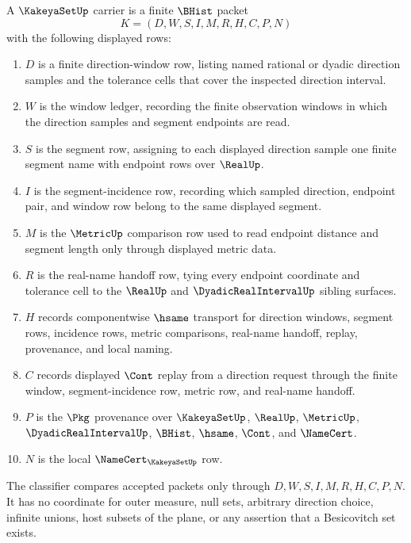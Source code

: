 \begin{definition}
\label{def:kakeya-set-carrier}
A $\KakeyaSetUp$ carrier is a finite $\BHist$ packet
$$
K=(D,W,S,I,M,R,H,C,P,N)
$$
with the following displayed rows:
\begin{enumerate}
\item $D$ is a finite direction-window row, listing named rational or dyadic direction samples and the tolerance cells that cover the inspected direction interval.
\item $W$ is the window ledger, recording the finite observation windows in which the direction samples and segment endpoints are read.
\item $S$ is the segment row, assigning to each displayed direction sample one finite segment name with endpoint rows over $\RealUp$.
\item $I$ is the segment-incidence row, recording which sampled direction, endpoint pair, and window row belong to the same displayed segment.
\item $M$ is the $\MetricUp$ comparison row used to read endpoint distance and segment length only through displayed metric data.
\item $R$ is the real-name handoff row, tying every endpoint coordinate and tolerance cell to the $\RealUp$ and $\DyadicRealIntervalUp$ sibling surfaces.
\item $H$ records componentwise $\hsame$ transport for direction windows, segment rows, incidence rows, metric comparisons, real-name handoff, replay, provenance, and local naming.
\item $C$ records displayed $\Cont$ replay from a direction request through the finite window, segment-incidence row, metric row, and real-name handoff.
\item $P$ is the $\Pkg$ provenance over $\KakeyaSetUp$, $\RealUp$, $\MetricUp$, $\DyadicRealIntervalUp$, $\BHist$, $\hsame$, $\Cont$, and $\NameCert$.
\item $N$ is the local $\NameCert_{\KakeyaSetUp}$ row.
\end{enumerate}
The classifier compares accepted packets only through $D,W,S,I,M,R,H,C,P,N$. It has no coordinate for outer measure, null sets, arbitrary direction choice, infinite unions, host subsets of the plane, or any assertion that a Besicovitch set exists.
\end{definition}

